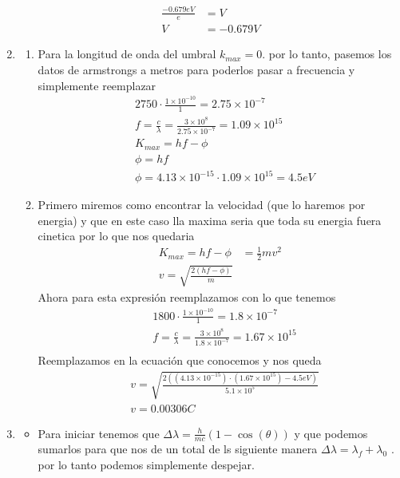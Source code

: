 \documentclass[12pt]{exam}
\begin{document}
\begin{enumerate}
\begin{align*}
			\frac{-0.679 eV}{e} &= V\\
			V &= -0.679V
		\end{align*}
	\item \begin{enumerate}
			\item Para la longitud de onda del umbral $k_{max}= 0$. por lo tanto, pasemos los datos de armstrongs a metros para poderlos pasar a frecuencia y simplemente reemplazar
				\begin{align*}
					&2750 \cdot \frac{1\times10^{-10}}{1} = 2.75\times 10^{-7}\\
					&f = \frac{c}{\lambda} = \frac{3\times 10^8}{2.75\times 10^{-7}} = 1.09\times 10^{15}\\
					&K_{max} = hf - \phi\\
					&\phi = hf\\
					&\phi = 4.13\times10^{-15}\cdot1.09\times 10^{15} = 4.5 eV
				\end{align*}
			\item Primero miremos como encontrar la velocidad (que lo haremos por energia) y que en este caso lla maxima seria que toda su energia fuera cinetica por lo que nos quedaria
				\begin{align*}
					K_{max} = hf -\phi &= \frac{1}{2}mv^2\\
					v = \sqrt{\frac{2(hf-\phi)}{m}}
				\end{align*}
				Ahora para esta expresión reemplazamos con lo que tenemos
				\begin{align*}
					&1800 \cdot \frac{1\times10^{-10}}{1} = 1.8\times 10^{-7}\\
					&f = \frac{c}{\lambda} = \frac{3\times10^8}{1.8\times10^{-7}} = 1.67\times 10^{15}\\
				\end{align*}
				Reemplazamos en la ecuación que conocemos y nos queda 
				\begin{align}
					&v = \sqrt{\frac{2((4.13\times10^{-15})\cdot(1.67\times10^{15})-4.5eV)}{5.1\times10^{5}}}\\
					&v = 0.00306 C
				\end{align}
	\end{enumerate}
	\item \begin{itemize}
			\item Para iniciar tenemos que $\Delta \lambda = \frac{h}{mc}(1-\cos(\theta))$ y que podemos sumarlos para que nos de un total de ls siguiente manera $\Delta \lambda = \lambda_f + \lambda_0$ . por lo tanto podemos simplemente despejar.

\end{itemize}
\end{enumerate}
\end{document}
